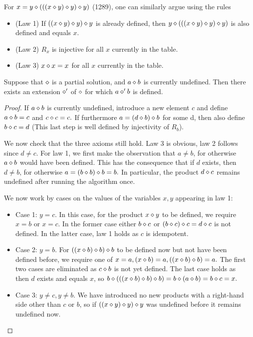 For $x = y \diamond (((x \diamond y) \diamond y) \diamond y)$ (1289), one can similarly argue using the rules
\begin{itemize}
\item (Law 1) If $((x \diamond y) \diamond y) \diamond y$ is already defined, then $y \diamond (((x \diamond y) \diamond y) \diamond y)$ is also defined and equals $x$.
\item (Law 2) $R_x$ is injective for all $x$ currently in the table.
\item (Law 3) $x\diamond x=x$ for all $x$ currently in the table.
\end{itemize}

\begin{lemma}[1289 extension]\label{1289-extension}\leanok{}  Suppose that $\diamond$ is a partial solution, and $a \diamond b$ is currently undefined.  Then there exists an extension $\diamond'$ of $\diamond$ for which $a \diamond' b$ is defined.
\end{lemma}

\begin{proof}
If $a \diamond b$ is currently undefined, introduce a new element $c$ and define $a \diamond b = c$ and $ c \diamond c = c.$ If furthermore $a = (d \diamond b) \diamond b$ for some d, then also define $b \diamond c = d$ (This last step is well defined by injectivity of $R_b$).

We now check that the three axioms still hold. Law 3 is obvious, law 2 follows since $d \not = c$. For law 1, we first make the observation that $a \not = b$, for otherwise $a \diamond b$ would have been defined. This has the consequence that if $d$ exists, then $d \not = b$, for otherwise $a = (b \diamond b) \diamond b = b.$ In particular, the product $d \diamond c$ remains undefined after running the algorithm once.

We now work by cases on the values of the variables $x,y$ appearing in law 1:
\begin{itemize}
\item Case 1: $y=c$. In this case, for the product $x \diamond y$ to be defined, we require $x =b$ or $x = c$. In the former case either $b \diamond c$ or $(b \diamond c) \diamond c = d \diamond c$ is not defined. In the latter case, law 1 holds as $c$ is idempotent.
\item Case 2: $y=b$. For $((x \diamond b) \diamond b) \diamond b$ to be defined now but not have been defined before, we require one of $x= a, (x \diamond b) = a, ((x \diamond b) \diamond b) = a.$ The first two cases are eliminated as $c \diamond b$ is not yet defined. The last case holds as then $d$ exists and equals $x$, so $b \diamond (((x \diamond b) \diamond b) \diamond b) = b \diamond (a \diamond b) = b \diamond c = x.$
\item Case 3: $y \not = c, y \not = b$. We have introduced no new products with a right-hand side other than $c$ or $b$, so if $((x \diamond y) \diamond y) \diamond y$ was undefined before it remains undefined now.
\end{itemize}
\end{proof}

